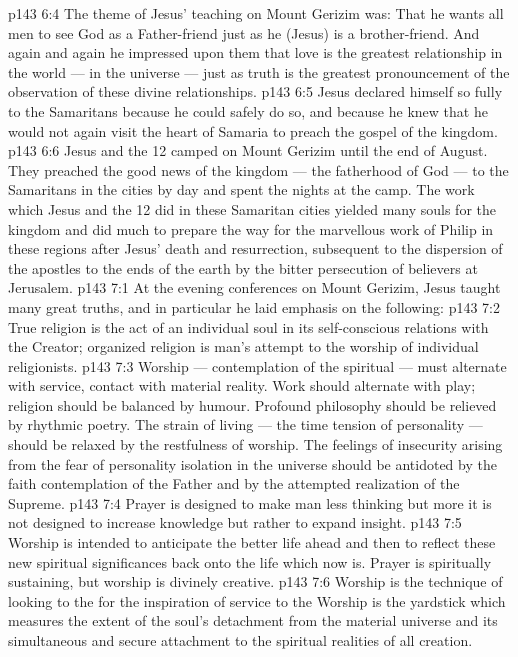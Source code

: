 \vs p143 6:4 The theme of Jesus’ teaching on Mount Gerizim was: That he wants all men to see God as a Father\hyp{}friend just as he (Jesus) is a brother\hyp{}friend. And again and again he impressed upon them that love is the greatest relationship in the world --- in the universe --- just as truth is the greatest pronouncement of the observation of these divine relationships.
\vs p143 6:5 Jesus declared himself so fully to the Samaritans because he could safely do so, and because he knew that he would not again visit the heart of Samaria to preach the gospel of the kingdom.
\vs p143 6:6 Jesus and the 12 camped on Mount Gerizim until the end of August. They preached the good news of the kingdom --- the fatherhood of God --- to the Samaritans in the cities by day and spent the nights at the camp. The work which Jesus and the 12 did in these Samaritan cities yielded many souls for the kingdom and did much to prepare the way for the marvellous work of Philip in these regions after Jesus’ death and resurrection, subsequent to the dispersion of the apostles to the ends of the earth by the bitter persecution of believers at Jerusalem.
\vs p143 7:1 At the evening conferences on Mount Gerizim, Jesus taught many great truths, and in particular he laid emphasis on the following:
\vs p143 7:2 \pc True religion is the act of an individual soul in its self\hyp{}conscious relations with the Creator; organized religion is man’s attempt to  the worship of individual religionists.
\vs p143 7:3 \pc Worship --- contemplation of the spiritual --- must alternate with service, contact with material reality. Work should alternate with play; religion should be balanced by humour. Profound philosophy should be relieved by rhythmic poetry. The strain of living --- the time tension of personality --- should be relaxed by the restfulness of worship. The feelings of insecurity arising from the fear of personality isolation in the universe should be antidoted by the faith contemplation of the Father and by the attempted realization of the Supreme.
\vs p143 7:4 \pc Prayer is designed to make man less thinking but more  it is not designed to increase knowledge but rather to expand insight.
\vs p143 7:5 \pc Worship is intended to anticipate the better life ahead and then to reflect these new spiritual significances back onto the life which now is. Prayer is spiritually sustaining, but worship is divinely creative.
\vs p143 7:6 \pc Worship is the technique of looking to the  for the inspiration of service to the  Worship is the yardstick which measures the extent of the soul’s detachment from the material universe and its simultaneous and secure attachment to the spiritual realities of all creation.
